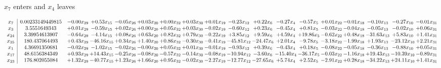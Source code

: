 \documentclass[9pt]{article}
\begin{document}
 $ x_{7} $ enters and $ x_{4} $ leaves 

 \[\begin{array}{c| c c@{\hskip 2pt} c@{\hskip 2pt} c@{\hskip 2pt} c@{\hskip 2pt} c@{\hskip 2pt} c@{\hskip 2pt} c@{\hskip 2pt} c@{\hskip 2pt} c@{\hskip 2pt} c@{\hskip 2pt} c@{\hskip 2pt} c@{\hskip 2pt} c@{\hskip 2pt} c@{\hskip 2pt} c@{\hskip 2pt} c@{\hskip 2pt} }
 x_{7}   &  0.00233149449815 & -0.00 x_{29} & +  0.53 x_{15} & -0.05 x_{26} & +  0.03 x_{20} & +  0.00 x_{32} & +  0.03 x_{30} & +  0.01 x_{19} & -0.23 x_{12} & +  0.22 x_{6} & -0.27 x_{4} & -0.57 x_{5} & +  0.01 x_{22} & -0.01 x_{18} & -0.10 x_{13} & -0.27 x_{10} & -0.01 x_{31}\\
 x_{3}   &  3.5551649343 & +  0.01 x_{29} & -0.59 x_{15} & +  0.02 x_{26} & +  0.00 x_{20} & +  0.05 x_{32} & +  0.03 x_{30} & -0.02 x_{19} & -0.60 x_{12} & +  0.23 x_{6} & -0.45 x_{4} & +  0.81 x_{5} & -0.03 x_{22} & -0.04 x_{18} & -0.05 x_{13} & -0.02 x_{10} & +  0.06 x_{31}\\
 x_{24}   &  3.39954613907 & -0.64 x_{29} & -4.14 x_{15} & +  0.08 x_{26} & +  0.63 x_{20} & +  0.82 x_{32} & +  0.79 x_{30} & -0.22 x_{19} & +  3.85 x_{12} & +  9.59 x_{6} & +  4.59 x_{4} & + 19.86 x_{5} & -0.62 x_{22} & +  0.48 x_{18} & -31.63 x_{13} & +  5.83 x_{10} & +  1.41 x_{31}\\
 x_{25}   &  180.437064493 & +  0.43 x_{29} & -46.16 x_{15} & +  0.34 x_{26} & +  1.40 x_{20} & +  0.86 x_{32} & -0.30 x_{30} & -0.41 x_{19} & -45.81 x_{12} & -24.47 x_{6} & +  2.01 x_{4} & -9.78 x_{5} & -3.18 x_{22} & -1.99 x_{18} & +  1.93 x_{13} & -23.12 x_{10} & +  2.21 x_{31}\\
 x_{1}   &  4.36691350681 & -0.02 x_{29} & -1.02 x_{15} & -0.02 x_{26} & -0.00 x_{20} & +  0.05 x_{32} & +  0.01 x_{30} & -0.01 x_{19} & -0.93 x_{12} & +  0.39 x_{6} & -0.43 x_{4} & +  0.18 x_{5} & -0.08 x_{22} & -0.05 x_{18} & -0.36 x_{13} & -0.88 x_{10} & +  0.05 x_{31}\\
 x_{17}   &  48.6156384349 & +  0.93 x_{29} & + 14.43 x_{15} & -0.25 x_{26} & -0.08 x_{20} & -0.57 x_{32} & -0.14 x_{30} & -0.08 x_{19} & -10.94 x_{12} & -3.60 x_{6} & -15.40 x_{4} & -36.17 x_{5} & -0.03 x_{22} & -1.16 x_{18} & + 19.43 x_{13} & -10.39 x_{10} & -0.89 x_{31}\\
 x_{23}   &  176.802055084 & +  1.32 x_{29} & -40.77 x_{15} & +  1.23 x_{26} & +  1.66 x_{20} & +  0.95 x_{32} & -0.02 x_{30} & -2.27 x_{19} & -12.77 x_{12} & -27.65 x_{6} & +  5.74 x_{4} & +  2.52 x_{5} & -2.91 x_{22} & +  0.28 x_{18} & -34.22 x_{13} & + 24.11 x_{10} & +  1.41 x_{31}\\

\end{array}\]
\end{document}

